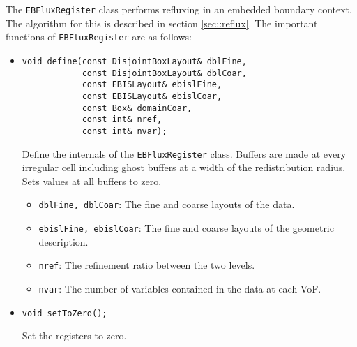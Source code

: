 The {\tt EBFluxRegister} class performs refluxing in an
embedded boundary context.  The algorithm for this is described in
section \ref{sec::reflux}.
The important functions of {\tt EBFluxRegister} are as follows:
\begin{itemize}
\item \begin{small}\begin{verbatim}
void define(const DisjointBoxLayout& dblFine,
            const DisjointBoxLayout& dblCoar,
            const EBISLayout& ebislFine,
            const EBISLayout& ebislCoar,
            const Box& domainCoar,
            const int& nref,
            const int& nvar);
\end{verbatim}\end{small}
Define the internals of the {\tt EBFluxRegister} class.  Buffers
are made at every irregular cell including ghost buffers at a width
of the redistribution radius. Sets values at all buffers to zero.
\begin{itemize}
\item {\tt dblFine, dblCoar}: The fine and coarse layouts
        of the data.
\item {\tt ebislFine, ebislCoar}: The fine and coarse layouts
        of the geometric description.
\item {\tt nref}: The refinement ratio between the two levels.
\item {\tt nvar}: The number of variables contained in the data
        at each VoF.
\end{itemize}

\item \begin{small}\begin{verbatim}
void setToZero();
\end{verbatim}\end{small}
Set the registers to zero.


\end{itemize}
